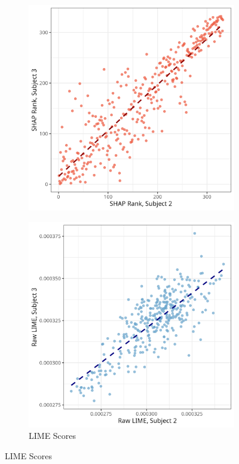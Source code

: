 \documentclass[10pt,letterpaper]{article}
\begin{document}
\begin{figure}[ht]
\begin{subfigure}[t]{0.22\textwidth}
        \includegraphics[width=\textwidth]{figs/scatter_buck_shap_rank.png}
        \label{subfig:scatter_buck_shap_rank}
    \end{subfigure}
    \hfill
    \begin{subfigure}[t]{0.22\textwidth}
        \centering
        \caption{LIME Scores}
        \includegraphics[width=\textwidth]{figs/scatter_buck_lime_raw.png}

\end{subfigure}
\end{figure}
\end{document}
